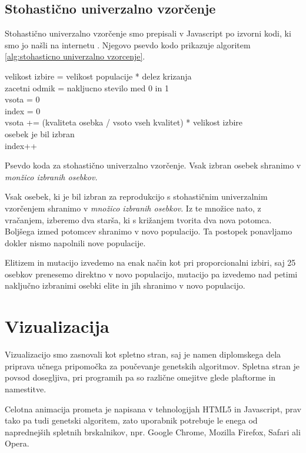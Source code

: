 \documentclass[a4paper, 12pt]{book}
\begin{document}
\subsection{Stohasti\v cno univerzalno vzor\v cenje}
Stohasti\v cno univerzalno vzor\v cenje smo prepisali v Javascript po izvorni kodi, ki smo jo na\v sli na internetu
\cite{github-stohasticno}. Njegovo psevdo kodo prikazuje algoritem \ref{alg:stohasticno univerzalno vzorcenje}.

\begin{algorithm}
\SetAlgoLined

velikost izbire = velikost populacije * delez krizanja\\
zacetni odmik = nakljucno stevilo med 0 in 1\\
vsota = 0\\
index = 0\\
{
	vsota += (kvaliteta osebka / vsoto vseh kvalitet) * velikost izbire\\
	{
		osebek je bil izbran\\
		index++
	}
}
\caption{Psevdo koda za stohasti\v cno univerzalno vzor\v cenje. Vsak izbran osebek shranimo v \textit{mon\v zico izbranih osebkov.}}
\label{alg:stohasticno univerzalno vzorcenje}
\end{algorithm}

Vsak osebek, ki je bil izbran za reprodukcijo s stohasti\v cnim univerzalnim vzor\v cenjem shranimo v \textit{mno\v zico izbranih osebkov}. Iz te mno\v zice nato, z vra\v canjem, izberemo dva star\v sa, ki s kri\v zanjem tvorita dva nova potomca. Bolj\v sega izmed potomcev shranimo v novo populacijo. Ta postopek ponavljamo dokler nismo napolnili nove populacije.

Elitizem in mutacijo izvedemo na enak na\v cin kot pri proporcionalni izbiri, saj 25 osebkov prenesemo direktno v novo populacijo, mutacijo pa izvedemo nad petimi naklju\v cno izbranimi osebki elite in jih shranimo v novo populacijo.
 
\section{Vizualizacija}
Vizualizacijo smo zasnovali kot spletno stran, saj je namen diplomskega dela priprava u\v cnega pripomo\v cka za pou\v cevanje genetskih algoritmov. Spletna stran je povsod dosegljiva, pri programih pa so razli\v cne omejitve glede plaftorme in namestitve. 

Celotna animacija prometa je napisana v tehnologijah HTML5 in Javascript, prav tako pa tudi genetski algoritem, zato uporabnik potrebuje le enega od naprednej\v sih spletnih brskalnikov, npr. Google Chrome, Mozilla Firefox, Safari ali Opera.
\end{document}

